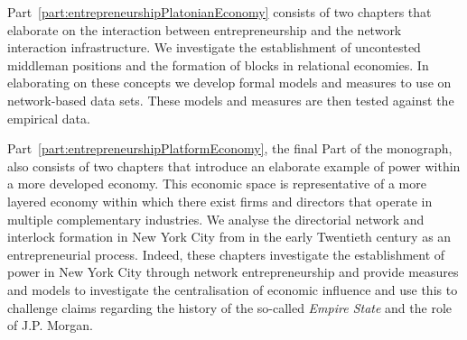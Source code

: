 Part~\ref{part:entrepreneurshipPlatonianEconomy} consists of two chapters that elaborate on the interaction between entrepreneurship and the network interaction infrastructure. We investigate the establishment of uncontested middleman positions and the formation of blocks in relational economies. In elaborating on these concepts we develop formal models and measures to use on network-based data sets. These models and measures are then tested against the empirical data.

Part~\ref{part:entrepreneurshipPlatformEconomy}, the final Part of the monograph, also consists of two chapters that introduce an elaborate example of power within a more developed economy. This economic space is representative of a more layered economy within which there exist firms and directors that operate in multiple complementary industries. We analyse the directorial network and interlock formation in New York City from in the early Twentieth century as an entrepreneurial process. Indeed, these chapters investigate the establishment of power in New York City through network entrepreneurship and provide measures and models to investigate the centralisation of economic influence and use this to challenge claims regarding the history of the so-called \emph{Empire State} and the role of J.P. Morgan.